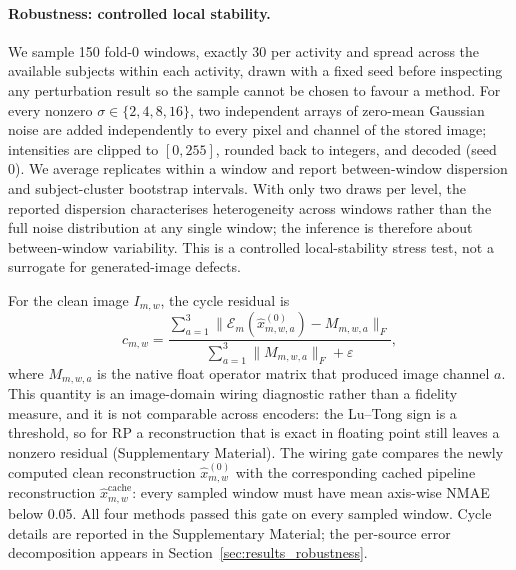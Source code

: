 \documentclass[5p]{elsarticle}
\begin{document}
\paragraph{Robustness: controlled local stability.}
We sample 150 fold-0 windows, exactly 30 per activity and spread across the available subjects within each activity, drawn with a fixed seed before inspecting any perturbation result so the sample cannot be chosen to favour a method. For every nonzero \(\sigma\in\{2,4,8,16\}\), two independent arrays of zero-mean Gaussian noise are added independently to every pixel and channel of the stored image; intensities are clipped to \([0,255]\), rounded back to integers, and decoded (seed 0). We average replicates within a window and report between-window dispersion and subject-cluster bootstrap intervals. With only two draws per level, the reported dispersion characterises heterogeneity across windows rather than the full noise distribution at any single window; the inference is therefore about between-window variability. This is a controlled local-stability stress test, not a surrogate for generated-image defects.

For the clean image \(I_{m,w}\), the cycle residual is
\[
c_{m,w}=\frac{\sum_{a=1}^{3}\lVert \mathcal E_m(\hat x^{(0)}_{m,w,a})-M_{m,w,a}\rVert_F}
{\sum_{a=1}^{3}\lVert M_{m,w,a}\rVert_F+\varepsilon},
\]
where \(M_{m,w,a}\) is the native float operator matrix that produced image channel \(a\). This quantity is an image-domain wiring diagnostic rather than a fidelity measure, and it is not comparable across encoders: the Lu--Tong sign is a threshold, so for RP a reconstruction that is exact in floating point still leaves a nonzero residual (Supplementary Material). The wiring gate compares the newly computed clean reconstruction \(\hat x^{(0)}_{m,w}\) with the corresponding cached pipeline reconstruction \(\hat x^{\mathrm{cache}}_{m,w}\): every sampled window must have mean axis-wise NMAE below 0.05. All four methods passed this gate on every sampled window. Cycle details are reported in the Supplementary Material; the per-source error decomposition appears in Section~\ref{sec:results_robustness}.
\end{document}
